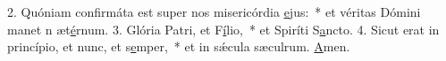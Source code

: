 2. Quóniam confirmáta est super nos misericórdia \uline{e}jus:~* et véritas Dómini manet n æt\uline{é}rnum.
3. Glória Patri, et F\uline{í}lio,~* et Spiríti S\uline{a}ncto.
4. Sicut erat in princípio, et nunc, et s\uline{e}mper,~* et in sǽcula sæculrum. \uline{A}men.
